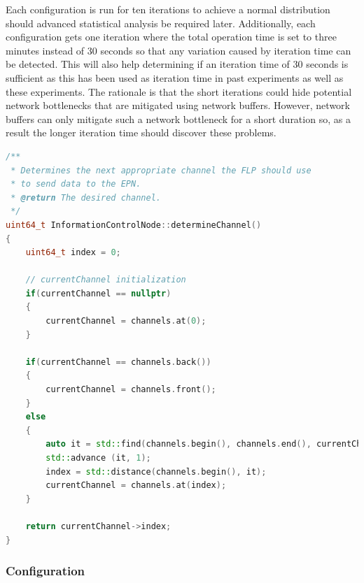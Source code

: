 \documentclass[]{article}
\begin{document}
Each configuration is run for ten iterations to achieve a normal distribution should advanced statistical analysis be required later. Additionally, each configuration gets one iteration where the total operation time is set to three minutes instead of 30 seconds so that any variation caused by iteration time can be detected. This will also help determining if an iteration time of 30 seconds is sufficient as this has been used as iteration time in past experiments as well as these experiments. The rationale is that the short iterations could hide potential network bottlenecks that are mitigated using network buffers. However, network buffers can only mitigate such a network bottleneck for a short duration so, as a result the longer iteration time should discover these problems.

\begin{lstlisting}[language=C++]
/**
 * Determines the next appropriate channel the FLP should use 
 * to send data to the EPN.
 * @return The desired channel.
 */
uint64_t InformationControlNode::determineChannel()
{
	uint64_t index = 0;

	// currentChannel initialization 
	if(currentChannel == nullptr)
	{
		currentChannel = channels.at(0);
	}

	if(currentChannel == channels.back())
	{
		currentChannel = channels.front();
	}
	else 
	{
		auto it = std::find(channels.begin(), channels.end(), currentChannel);
		std::advance (it, 1);
		index = std::distance(channels.begin(), it);
		currentChannel = channels.at(index);
	}

	return currentChannel->index;
}
\end{lstlisting}

\subsubsection{Configuration}
\end{document}
